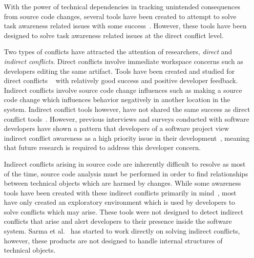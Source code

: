 With the power of technical dependencies in tracking unintended consequences from source code changes, several tools 
have been created to attempt to solve task awareness related issues with some 
success~\cite{Xiang:2008:ERT, Biehl:2007:FVD, Sarma:2009:TIV, Khurana:2009:PFC}. However, these tools have been designed 
to solve task awareness related issues at the direct conflict level. 

Two types of conflicts have attracted the attention of researchers, \textit{direct} and 
\textit{indirect conflicts}. Direct conflicts involve immediate workspace concerns such as developers editing the same
artifact. Tools have been created and studied for direct conflicts
~\cite{Xiang:2008:ERT, Biehl:2007:FVD, Sarma:2009:TIV, Khurana:2009:PFC} with relatively good success and 
positive developer feedback. Indirect conflicts involve source code change influences such as making a source code change 
which influences behavior negatively in another location in the system. Indirect conflict tools however, have
not shared the same success as direct conflict 
tools~\cite{Sarma:2007:TSA, Holmes:2010:CAR, Trainer:2005:BGT, Servant:2010:CPI, Borici:2012:CHA}. However,
previous interviews and surveys conducted with software developers have shown a pattern that developers 
of a software project view indirect conflict awareness  as a high priority issue in their 
development~\cite{Damian:2007:GSE, Halverson:2006:DTV, Begel:2010:CDE, Schroter:2012:TTF}, meaning that future research
is required to address this developer concern.

Indirect conflicts arising in source code are inherently difficult to resolve as most of the time, source code analysis must 
be performed in order to find relationships between technical objects which are harmed by changes. While some awareness 
tools have been created with these indirect conflicts primarily in mind~\cite{Begel:2010:CDE, Trainer:2005:BGT}, most have only 
created an exploratory environment which is used by developers to solve conflicts which may arise. These tools were not designed 
to detect indirect conflicts that arise and alert developers to their presence  inside the software system. 
Sarma et al.~\cite{Sarma:2007:TSA} has started to work directly on solving indirect conflicts, however, these products are not 
designed to handle internal structures of technical objects.

